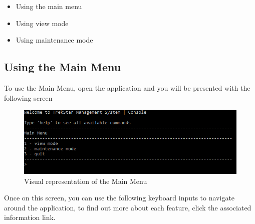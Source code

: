 \documentclass[
  english,
  a4paper,
,tablecaptionabove
]{scrartcl}
\providecommand{\tightlist}{%
  \setlength{\itemsep}{0pt}\setlength{\parskip}{0pt}}
\begin{document}
\begin{itemize}
\tightlist
\item
  Using the main menu
\item
  Using view mode
\item
  Using maintenance mode
\end{itemize}

\hypertarget{using-the-main-menu}{%
\subsection{Using the Main Menu}\label{using-the-main-menu}}

To use the Main Menu, open the application and you will be presented
with the following screen

\begin{figure}
\centering
\includegraphics{images/user-guide/main-menu/using-the-main-menu.png}
\caption{Visual representation of the Main Menu}
\end{figure}

Once on this screen, you can use the following keyboard inputs to
navigate around the application, to find out more about each feature,
click the associated information link.
\end{document}
